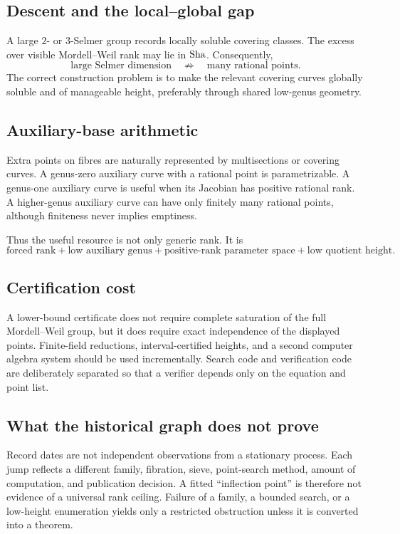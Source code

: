 \subsection{Descent and the local--global gap}

A large $2$- or $3$-Selmer group records locally soluble covering classes.
The excess over visible Mordell--Weil rank may lie in $\operatorname{Sha}$.  Consequently,
\[
\text{large Selmer dimension}
\quad\not\Longrightarrow\quad
\text{many rational points}.
\]
The correct construction problem is to make the relevant covering curves
globally soluble and of manageable height, preferably through shared
low-genus geometry.

\subsection{Auxiliary-base arithmetic}

Extra points on fibres are naturally represented by multisections or covering
curves.  A genus-zero auxiliary curve with a rational point is parametrizable.
A genus-one auxiliary curve is useful when its Jacobian has positive rational
rank.  A higher-genus auxiliary curve can have only finitely many rational
points, although finiteness never implies emptiness.

Thus the useful resource is not only generic rank.  It is
\[
\text{forced rank}
+\text{low auxiliary genus}
+\text{positive-rank parameter space}
+\text{low quotient height}.
\]

\subsection{Certification cost}

A lower-bound certificate does not require complete saturation of the full
Mordell--Weil group, but it does require exact independence of the displayed
points.  Finite-field reductions, interval-certified heights, and a second
computer algebra system should be used incrementally.  Search code and
verification code are deliberately separated so that a verifier depends only
on the equation and point list.

\subsection{What the historical graph does not prove}

Record dates are not independent observations from a stationary process.
Each jump reflects a different family, fibration, sieve, point-search method,
amount of computation, and publication decision.  A fitted ``inflection
point'' is therefore not evidence of a universal rank ceiling.  Failure of a
family, a bounded search, or a low-height enumeration yields only a restricted
obstruction unless it is converted into a theorem.
